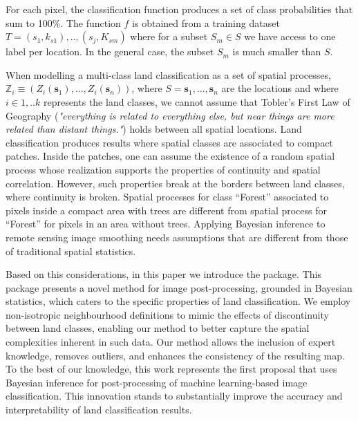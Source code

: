 \documentclass[
  shortnames]{jss}
\begin{document}
For each pixel, the classification function produces a set of class probabilities that sum to 100\%. The function \(f\) is obtained from a training dataset \(T = {(s_1, k_{s1}),..,(s_j, K_{sm})}\) where for a subset \(S_m \in S\) we have access to one label per location. In the general case, the subset \(S_m\) is much smaller than \(S\).

When modelling a multi-class land classification as a set of spatial processes, \(\mathbb{Z}_i \equiv (Z_i(\mathbf{s}_1), ..., Z_i(\mathbf{s}_n))\), where \(S = {\mathbf{s}_1, ..., \mathbf{s}_n}\) are the locations and where \(i \in {1,..k}\) represents the land classes, we cannot assume that Tobler's First Law of Geography (\textit{"everything is related to everything else, but near things are more related than distant things."}) holds between all spatial locations. Land classification produces results where spatial classes are associated to compact patches. Inside the patches, one can assume the existence of a random spatial process whose realization supports the properties of continuity and spatial correlation. However, such properties break at the borders between land classes, where continuity is broken. Spatial processes for class ``Forest'' associated to pixels inside a compact area with trees are different from spatial process for ``Forest'' for pixels in an area without trees. Applying Bayesian inference to remote sensing image smoothing needs assumptions that are different from those of traditional spatial statistics.

Based on this considerations, in this paper we introduce the  package. This package presents a novel method for image post-processing, grounded in Bayesian statistics, which caters to the specific properties of land classification. We employ non-isotropic neighbourhood definitions to mimic the effects of discontinuity between land classes, enabling our method to better capture the spatial complexities inherent in such data. Our method allows the inclusion of expert knowledge, removes outliers, and enhances the consistency of the resulting map. To the best of our knowledge, this work represents the first proposal that uses Bayesian inference for post-processing of machine learning-based image classification. This innovation stands to substantially improve the accuracy and interpretability of land classification results.
\end{document}
